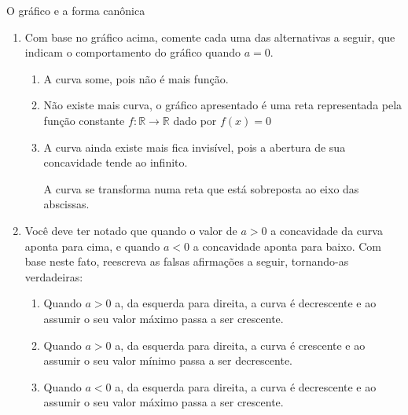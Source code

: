 \begin{task}{O gráfico e a forma canônica}
\begin{enumerate}
\begin{center}
\end{center}
\item {} 
Com base no gráfico acima, comente cada uma das alternativas a seguir, que indicam o comportamento do gráfico quando \(a=0\).

\begin{enumerate}
\item A curva some, pois não é mais função.

\item Não existe mais curva, o gráfico apresentado é uma reta representada pela função constante \(f:\mathbb{R}\to\mathbb{R}\) dado por \(f(x)=0\)

\item A curva ainda existe mais fica invisível, pois a abertura de sua concavidade tende ao infinito.

A curva se transforma numa reta que está sobreposta ao eixo das abscissas.
\end{enumerate}

\item {} 
Você deve ter notado que quando o valor de \(a>0\) a concavidade da curva aponta para cima, e quando \(a<0\) a concavidade aponta para baixo. Com base neste fato, reescreva as falsas afirmações a seguir, tornando-as verdadeiras:

\begin{enumerate}
\item Quando \(a>0\) a, da esquerda para direita, a curva é decrescente e ao assumir o seu valor máximo passa a ser crescente.

\item Quando \(a>0\) a, da esquerda para direita, a curva é crescente e ao assumir o seu valor mínimo passa a ser decrescente.

\item Quando \(a<0\) a, da esquerda para direita, a curva é decrescente e ao assumir o seu valor máximo passa a ser crescente.


\end{enumerate}
\end{enumerate}
\end{task}
